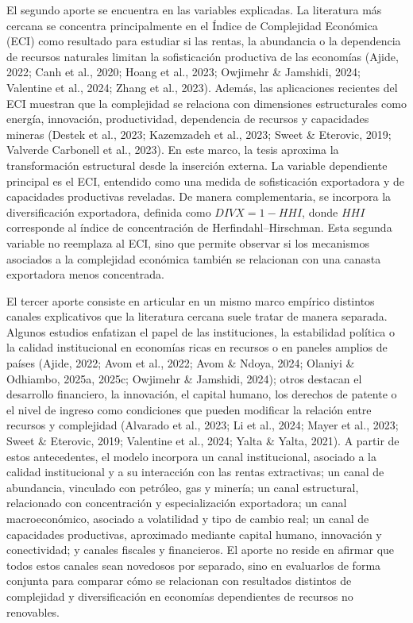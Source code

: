 \documentclass[12pt,a4paper]{article}
\begin{document}
El segundo aporte se encuentra en las variables explicadas. La literatura más cercana se concentra principalmente en el Índice de Complejidad Económica (ECI) como resultado para estudiar si las rentas, la abundancia o la dependencia de recursos naturales limitan la sofisticación productiva de las economías (Ajide, 2022; Canh et al., 2020; Hoang et al., 2023; Owjimehr \& Jamshidi, 2024; Valentine et al., 2024; Zhang et al., 2023). Además, las aplicaciones recientes del ECI muestran que la complejidad se relaciona con dimensiones estructurales como energía, innovación, productividad, dependencia de recursos y capacidades mineras (Destek et al., 2023; Kazemzadeh et al., 2023; Sweet \& Eterovic, 2019; Valverde Carbonell et al., 2023). En este marco, la tesis aproxima la transformación estructural desde la inserción externa. La variable dependiente principal es el ECI, entendido como una medida de sofisticación exportadora y de capacidades productivas reveladas. De manera complementaria, se incorpora la diversificación exportadora, definida como $DIVX=1-HHI$, donde $HHI$ corresponde al índice de concentración de Herfindahl--Hirschman. Esta segunda variable no reemplaza al ECI, sino que permite observar si los mecanismos asociados a la complejidad económica también se relacionan con una canasta exportadora menos concentrada.

El tercer aporte consiste en articular en un mismo marco empírico distintos canales explicativos que la literatura cercana suele tratar de manera separada. Algunos estudios enfatizan el papel de las instituciones, la estabilidad política o la calidad institucional en economías ricas en recursos o en paneles amplios de países (Ajide, 2022; Avom et al., 2022; Avom \& Ndoya, 2024; Olaniyi \& Odhiambo, 2025a, 2025c; Owjimehr \& Jamshidi, 2024); otros destacan el desarrollo financiero, la innovación, el capital humano, los derechos de patente o el nivel de ingreso como condiciones que pueden modificar la relación entre recursos y complejidad (Alvarado et al., 2023; Li et al., 2024; Mayer et al., 2023; Sweet \& Eterovic, 2019; Valentine et al., 2024; Yalta \& Yalta, 2021). A partir de estos antecedentes, el modelo incorpora un canal institucional, asociado a la calidad institucional y a su interacción con las rentas extractivas; un canal de abundancia, vinculado con petróleo, gas y minería; un canal estructural, relacionado con concentración y especialización exportadora; un canal macroeconómico, asociado a volatilidad y tipo de cambio real; un canal de capacidades productivas, aproximado mediante capital humano, innovación y conectividad; y canales fiscales y financieros. El aporte no reside en afirmar que todos estos canales sean novedosos por separado, sino en evaluarlos de forma conjunta para comparar cómo se relacionan con resultados distintos de complejidad y diversificación en economías dependientes de recursos no renovables.
\end{document}
